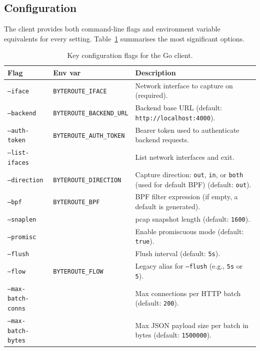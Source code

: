 \documentclass[12pt]{report}
\begin{document}
\subsection{Configuration}

The client provides both command-line flags and environment variable equivalents
for every setting. Table~\ref{tab:client-flags} summarises the most significant
options.

\begin{table}[htbp]
  \centering
  \footnotesize
  \setlength{\tabcolsep}{3pt}
  \renewcommand{\arraystretch}{0.9}
  \caption{Key configuration flags for the Go client.}
  \label{tab:client-flags}
  \begin{tabularx}{\textwidth}{p{}p{}X}
    \toprule
    \textbf{Flag} & \textbf{Env var} & \textbf{Description} \\
    \midrule
    \texttt{--iface} & \texttt{BYTEROUTE\_IFACE} &
      Network interface to capture on (required). \\
    \texttt{--backend} & \texttt{BYTEROUTE\_BACKEND\_URL} &
      Backend base URL (default: \texttt{http://localhost:4000}). \\
    \texttt{--auth-token} & \texttt{BYTEROUTE\_AUTH\_TOKEN} &
      Bearer token used to authenticate backend requests. \\
    \texttt{--list-ifaces} & & List network interfaces and exit. \\
    \texttt{--direction} & \texttt{BYTEROUTE\_DIRECTION} &
      Capture direction: \texttt{out}, \texttt{in}, or \texttt{both} (used for default BPF) (default: \texttt{out}). \\
    \texttt{--bpf} & \texttt{BYTEROUTE\_BPF} &
      BPF filter expression (if empty, a default is generated). \\
    \texttt{--snaplen} & & pcap snapshot length (default: \texttt{1600}). \\
    \texttt{--promisc} & & Enable promiscuous mode (default: \texttt{true}). \\
    \texttt{--flush} & & Flush interval (default: \texttt{5s}). \\
    \texttt{--flow} & \texttt{BYTEROUTE\_FLOW} &
      Legacy alias for \texttt{--flush} (e.g., \texttt{5s} or \texttt{5}). \\
    \texttt{--max-batch-conns} & & Max connections per HTTP batch (default: \texttt{200}). \\
    \texttt{--max-batch-bytes} & & Max JSON payload size per batch in bytes (default: \texttt{1500000}). \\

\end{tabularx}
\end{table}
\end{document}
